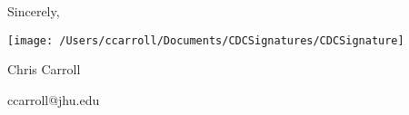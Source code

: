 \vspace{0.5in}
\hfill\parbox[c]{3in}{
Sincerely,

\texttt{[image: /Users/ccarroll/Documents/CDCSignatures/CDCSignature]}

Chris Carroll

ccarroll@jhu.edu
}

